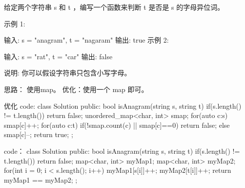给定两个字符串 s 和 t ，编写一个函数来判断 t 是否是 s 的字母异位词。

示例 1:

输入: s = "anagram", t = "nagaram"
输出: true
示例 2:

输入: s = "rat", t = "car"
输出: false

说明:
你可以假设字符串只包含小写字母。

















思路：
使用map。 
优化：使用一个 map 即可。












优化 code:
class Solution {
public:
    bool isAnagram(string s, string t) {
        if(s.length() != t.length()) return false;
        unordered_map<char, int> smap;
        for(auto c:s) smap[c]++;
        for(auto c:t)
        {
            if(!smap.count(c) || smap[c]==0) return false;
            else smap[c]--;
        }
        return true;
    }
};







code：
class Solution {
public:
    bool isAnagram(string s, string t) {
        if(s.length() != t.length()) return false;
        map<char, int> myMap1;
        map<char, int> myMap2;
        for(int i = 0; i < s.length(); i++)
        {
            myMap1[s[i]]++;
            myMap2[t[i]]++;
        }
        return myMap1 == myMap2;
    }
};